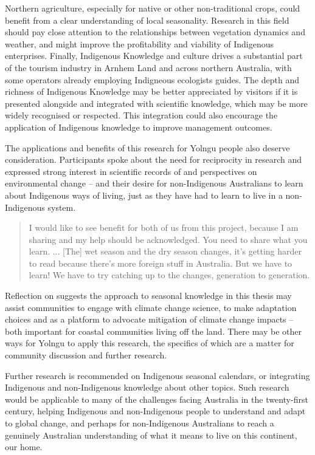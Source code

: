 Northern agriculture, especially for native or other non-traditional crops,
could benefit from a clear understanding of local seasonality.  Research in
this field should pay close attention to the relationships between vegetation
dynamics and weather, and might improve the profitability and viability of Indigenous
enterprises.
%
%
Finally, Indigenous Knowledge and culture drives a substantial part of the
tourism industry in Arnhem Land and across northern Australia, with some
operators already employing Indigneous ecologists guides.  The depth and
richness of Indigenous Knowledge may be better appreciated by visitors if
it is presented alongside and integrated with scientific knowledge, which
may be more widely recognised or respected.  This integration could also
encourage the application of Indigenous knowledge to improve management outcomes.


The applications and benefits of this research for Yolngu people also deserve
consideration.  Participants spoke about the need for reciprocity in research
and expressed strong interest in scientific records of and perspectives on
environmental change -- and their desire for non-Indigenous Australians to
learn about Indigenous ways of living, just as they have had to learn to
live in a non-Indigenous system.
\begin{quote}
    I would like to see benefit for both of us from this project, because I am
    sharing and my help should be acknowledged.  You need to share what you learn. ...
    [The] wet season and the dry season changes, it's getting harder to read
    because there's more foreign stuff in Australia.  But we have to learn!
    We have to try catching up to the changes, generation to generation.
\end{quote}
Reflection on \citet{petheram2010} suggests the approach to seasonal knowledge in this thesis
may assist communities to engage with climate change science, to make
adaptation choices and as a platform to advocate mitigation of climate change impacts -- both
important for coastal communities living off the land.  There may be other
ways for Yolngu to apply this research, the specifics of which are a matter for
community discussion and further research.


Further research is recommended on Indigenous seasonal calendars, or
integrating Indigenous and non-Indigenous knowledge about other topics.  Such
research would be applicable to many of the challenges facing
Australia in the twenty-first century, helping Indigenous and non-Indigenous
people to understand and adapt to global change, and perhaps for non-Indigenous
Australians to reach a genuinely Australian understanding of what it means to
live on this continent, our home.

